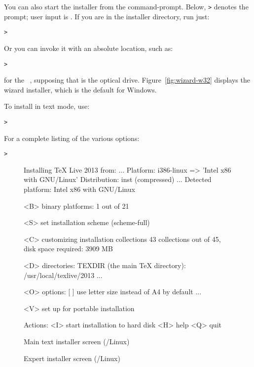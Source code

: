 \documentclass{article}
\begin{document}
You can also start the installer from the command-prompt.  Below,
\texttt{>} denotes the prompt; user input is .  If
you are in the installer directory, run just:
\begin{alltt}
> 
\end{alltt}

Or you can invoke it with an absolute location, such as:
\begin{alltt}
> 
\end{alltt}
for the \TK\ \DVD, supposing that  is the optical
drive. Figure~\ref{fig:wizard-w32} displays the wizard installer, which
is the default for Windows.

To install in text mode, use:
\begin{alltt}
> 
\end{alltt}

For a complete listing of the various options:
\begin{alltt}
> 
\end{alltt}

\begin{figure}[tb]
\begin{boxedverbatim}
Installing TeX Live 2013 from: ...
Platform: i386-linux => 'Intel x86 with GNU/Linux'
Distribution: inst (compressed)
...
 Detected platform: Intel x86 with GNU/Linux
 
 <B> binary platforms: 1 out of 21

 <S> set installation scheme (scheme-full)

 <C> customizing installation collections
     43 collections out of 45, disk space required: 3909 MB

 <D> directories:
   TEXDIR (the main TeX directory):
     /usr/local/texlive/2013
   ...

 <O> options:
   [ ] use letter size instead of A4 by default
   ...
 
 <V> set up for portable installation

Actions:
 <I> start installation to hard disk
 <H> help
 <Q> quit
\end{boxedverbatim}
\caption{Main text installer screen (\GNU/Linux)}\label{fig:text-main}
\end{figure}

\begin{figure}[tb]
\caption{Expert \GUI{} installer screen (\GNU/Linux)}\label{fig:gui-main}
\end{figure}
\end{document}
